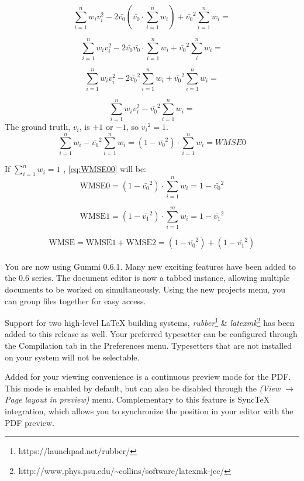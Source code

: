 \documentclass[11pt]{article}
\begin{document}
\[\sum_{i=1}^{n} w_i v_i^2 - 2\bar{v_0} (\bar{v_0} \cdot \sum_{i=1}^n w_i) + 
\bar{v_0}^2\sum_{i=1}^{n} w_i=\]

\[\sum_{i=1}^{n} w_i v_i^2 - 2\bar{v_0} \bar{v_0} \cdot \sum_{i=1}^n w_i 
+ \bar{v_0}^2\sum_i^n w_i=\]

\[\sum_{i=1}^{n} w_i v_i^2 - 2\bar{v_0}^2 \sum_{i=1}^n w_i  + 
\bar{v_0}^2 \sum_{i=1}^n w_i=\]

\[\sum_{i=1}^{n} w_i v_i^2 - \bar{v_0}^2 \sum_{i=1}^n w_i = \]
The ground truth, $v_i$, is $+1$ or $-1$, so ${v_i}^2=1$.\\

\begin{equation}
\label{eq:WMSE00}
\sum_{i=1}^{n} w_i - \bar{v_0}^2 \sum_{i=1}^n w_i =
(1 - \bar{v_0}^2) \cdot \sum_{i=1}^{n} w_i = WMSE0
\end{equation}

If $\sum_{i=1}^{n} w_i =1$ , \eqref{eq:WMSE00} will be:
\begin{equation}
\label{eq:WMSE0}
\text{WMSE0} = (1 - \bar{v_0}^2) \cdot \sum_{i=1}^{n} w_i = 1-\bar{v_0}^2
\end{equation}

\begin{equation}
\label{eq:WMSE1}
\text{WMSE1} = (1 - \bar{v_1}^2) \cdot \sum_{i=1}^{m} w_i = 1-\bar{v_1}^2
\end{equation}

\begin{equation}
\label{eq:WMSE_01}
\text{WMSE} = \text{WMSE1} + \text{WMSE2} = (1-\bar{v_0}^2) + (1-\bar{v_1}^2) 
\end{equation}\\

You are now using Gummi 0.6.1. Many new exciting features have been added to the 0.6 series. The document editor is now a tabbed instance, allowing multiple documents to be worked on simultaneously. Using the new projects menu, you can group files together for easy access. 

Support for two high-level {\LaTeX} building systems, \emph{rubber}\footnote{https://launchpad.net/rubber/} \& \emph{latexmk}\footnote{http://www.phys.psu.edu/{\textasciitilde}collins/software/latexmk-jcc/} has been added to this release as well. Your preferred typesetter can be configured through the Compilation tab in the Preferences menu. Typesetters that are not installed on your system will not be selectable. 

Added for your viewing convenience is a continuous preview mode for the PDF. This mode is enabled by default, but can also be disabled through the \emph{(View $\rightarrow$ Page layout in preview)} menu. Complementary to this feature is SyncTeX integration, which allows you to synchronize the position in your editor with the PDF preview. 
\end{document}
